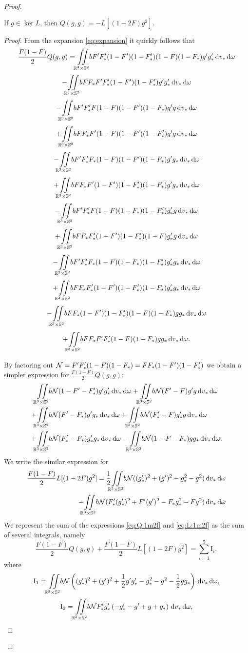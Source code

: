 \begin{proof}
\begin{proposition}
	If $g\in\ker L$, then $Q(g,g)=-L[(1-2F)g^2]$.
\end{proposition}
\begin{proof}
From the expansion \eqref{eq:expansion} it quickly follows that
\[	\frac {F(1-F)}{2}Q(g,g)= \col b  F'F'_\ast(1-F')(1-F'_\ast)(1-F)(1-F_\ast)g'g'_\ast \dv_\ast\dom  \]
	\[-\col b FF_\ast F'F'_\ast(1-F')(1-F'_\ast) g'g'_\ast\dv_\ast\dom\]
 \[-\col bF'F'_\ast F(1-F)(1-F')(1-F_\ast)g'g \dv_\ast\dom\]
 \[+\col bFF_\ast F'(1-F)(1-F')(1-F'_\ast)  g'g \dv_\ast\dom\]
\[-\col b F'F'_\ast F_\ast(1-F)(1-F')(1-F_\ast)g'g_\ast\dv_\ast\dom\]
\[+\col bFF_\ast F'(1-F')(1-F'_\ast)(1-F_\ast)  g'g_\ast\dv_\ast\dom\]
 \[-\col bF'F'_\ast F(1-F)(1-F_\ast)(1-F'_\ast)g'_\ast g\dv_\ast\dom\]
 \[+\col bFF_\ast F'_\ast(1-F')(1-F'_\ast)(1-F) g'_\ast g\dv_\ast\dom\]
 \[-\col bF'F'_\ast F_\ast(1-F)(1-F_\ast)(1-F'_\ast)g'_\ast g_\ast\dv_\ast\dom\]
 \[+\col bFF_\ast F'_\ast(1-F')(1-F'_\ast)(1-F_\ast) g'_\ast g_\ast\dv_\ast\dom\]
\[-\col bF F _\ast(1-F')(1-F'_\ast)(1-F)(1-F_\ast)g g _\ast\dv_\ast\dom\]
\[+\col bFF_\ast F'F'_\ast(1-F )(1-F _\ast) g g _\ast\dv_\ast\dom.\]

By factoring out $\mcn =  F'F'_\ast(1-F )(1-F _\ast)=FF_\ast  (1-F')(1-F'_\ast) $ we obtain a simpler expression for $\frac {F(1-F)}{2}Q(g,g)$:
\begin{align}\label{eq:Q:1m2f}
	 	 & \col b  \mcn (  1-F'- F'_\ast )g'g'_\ast \dv_\ast\dom   +\col b\mcn (F'-  F  ) g'g \dv_\ast\dom\notag\\
 +&\col b\mcn(F'- F_\ast  )  g'g_\ast\dv_\ast\dom +\col b\mcn(F'_\ast-  F  ) g'_\ast g\dv_\ast\dom \notag\\
   +&\col b\mcn(F'_\ast-  F_\ast  ) g'_\ast g_\ast\dv_\ast\dom  -\col b\mcn (  1-F-F_\ast ) g g _\ast\dv_\ast\dom. 
\end{align}
We write the similar expression for  
\begin{equation}\label{eq:L:1m2f}
 	\begin{split}
 		 \frac {F(1-F)}{2}L[(1-2F)g^2] = \frac 12\col b \mcn (  (g'_\ast)^2+(g')^2 -  g _\ast^2- g^2)\dv_\ast\dom \\- \col b \mcn(  F'_\ast(g'_\ast)^2+F'(g')^2 -  F _\ast g _\ast^2- Fg^2)\dv_\ast\dom
 	\end{split}
 \end{equation} 
We represent the sum of the expressions \eqref{eq:Q:1m2f}  and  \eqref{eq:L:1m2f} as the sum of several integrals, namely 
\[\frac {F(1-F)}{2}Q(g,g)+\frac {F(1-F)}{2}L[(1-2F)g^2]=\sum_{i=1}^5\mathrm I_i,\]
where
 \[\mathrm I_1 = \col b \mcn \left(  (g'_\ast)^2+(g')^2 +\frac 12 g'g'_\ast-  g _\ast^2- g^2-\frac 12 g g _\ast\right)\dv_\ast\dom   ,\]
  \[\mathrm I_2 = \col b \mcn F'_\ast g'_\ast   \left(-g'_\ast-g'  +g +g_\ast\right)\dv_\ast\dom ,  \]


\end{proof}
\end{proof}
